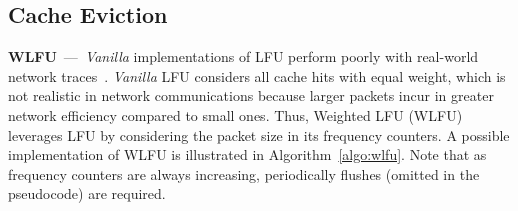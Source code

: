 \subsection{Cache Eviction}\label{sec:evi}

\textbf{WLFU}~---~\textit{Vanilla} implementations of LFU perform poorly with real-world network traces~\cite{Kim:09}.
\textit{Vanilla} LFU considers all cache hits with equal weight, which is not realistic in network communications because larger packets incur in greater network efficiency compared to small ones.
Thus, Weighted LFU (WLFU) leverages LFU by considering the packet size in its frequency counters.
A possible implementation of WLFU is illustrated in Algorithm~\ref{algo:wlfu}.
Note that as frequency counters are always increasing, periodically flushes (omitted in the pseudocode) are required.

